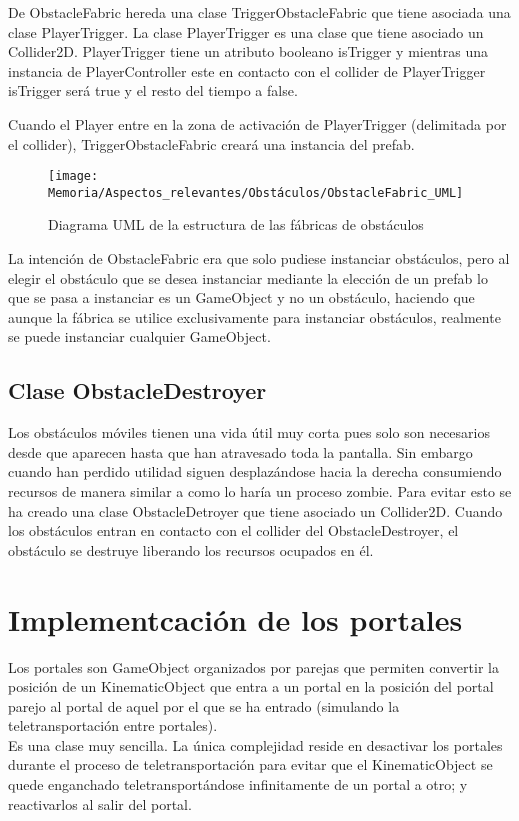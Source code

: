 De ObstacleFabric hereda una clase TriggerObstacleFabric que tiene asociada una clase PlayerTrigger. La clase PlayerTrigger es una clase que tiene asociado un Collider2D. PlayerTrigger tiene un atributo booleano isTrigger y mientras una instancia de PlayerController este en contacto con el collider de PlayerTrigger isTrigger será true y el resto del tiempo a false.

Cuando el Player entre en la zona de activación de PlayerTrigger (delimitada por el collider), TriggerObstacleFabric creará una instancia del prefab.

\begin{figure}[h]
\centering
\texttt{[image: Memoria/Aspectos\_relevantes/Obstáculos/ObstacleFabric\_UML]}
\caption{Diagrama UML de la estructura de las fábricas de obstáculos}
\end{figure}

La intención de ObstacleFabric era que solo pudiese instanciar obstáculos, pero al elegir el obstáculo que se desea instanciar mediante la elección de un prefab lo que se pasa a instanciar es un GameObject y no un obstáculo, haciendo que aunque la fábrica se utilice exclusivamente para instanciar obstáculos, realmente se puede instanciar cualquier GameObject.

\subsection{Clase ObstacleDestroyer}
Los obstáculos móviles tienen una vida útil muy corta pues solo son necesarios desde que aparecen hasta que han atravesado toda la pantalla. Sin embargo cuando han perdido utilidad siguen desplazándose hacia la derecha consumiendo recursos de manera similar a como lo haría un proceso zombie. Para evitar esto se ha creado una clase ObstacleDetroyer que tiene asociado un Collider2D. Cuando los obstáculos entran en contacto con el collider del ObstacleDestroyer, el obstáculo se destruye liberando los recursos ocupados en él.

\section{Implementcación de los portales}
Los portales son GameObject organizados por parejas que permiten convertir la posición de un KinematicObject que entra a un portal en la posición del portal parejo al portal de aquel por el que se ha entrado (simulando la teletransportación entre portales).\\
Es una clase muy sencilla. La única complejidad reside en desactivar los portales durante el proceso de teletransportación para evitar que el KinematicObject se quede enganchado teletransportándose infinitamente de un portal a otro; y reactivarlos al salir del portal.

